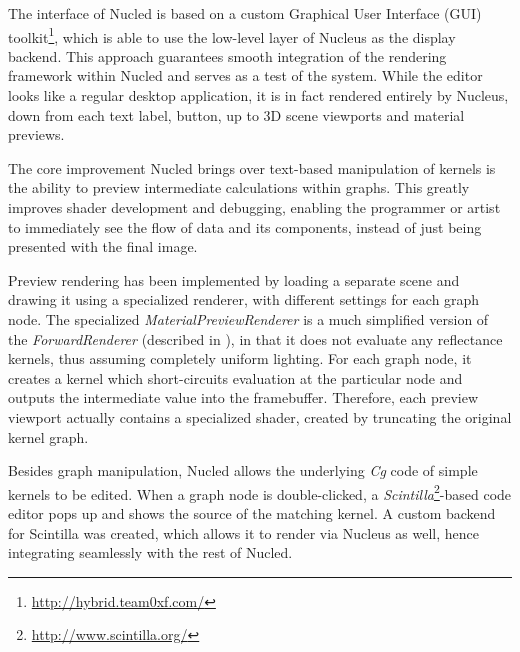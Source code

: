 The interface of Nucled is based on a custom Graphical User Interface (GUI) toolkit\footnote{\url{http://hybrid.team0xf.com/}}, which is able to use the low-level layer of Nucleus as the display backend. This approach guarantees smooth integration of the rendering framework within Nucled and serves as a test of the system. While the editor looks like a regular desktop application, it is in fact rendered entirely by Nucleus, down from each text label, button, up to 3D scene viewports and material previews.

The core improvement Nucled brings over text-based manipulation of kernels is the ability to preview intermediate calculations within graphs. This greatly improves shader development and debugging, enabling the programmer or artist to immediately see the flow of data and its components, instead of just being presented with the final image.

Preview rendering has been implemented by loading a separate scene and drawing it using a specialized renderer, with different settings for each graph node. The specialized \emph{MaterialPreviewRenderer} is a much simplified version of the \emph{ForwardRenderer} (described in ), in that it does not evaluate any reflectance kernels, thus assuming completely uniform lighting. For each graph node, it creates a kernel which short-circuits evaluation at the particular node and outputs the intermediate value into the framebuffer. Therefore, each preview viewport actually contains a specialized shader, created by truncating the original kernel graph.

Besides graph manipulation, Nucled allows the underlying \emph{Cg} code of simple kernels to be edited. When a graph node is double-clicked, a \emph{Scintilla}\footnote{\url{http://www.scintilla.org/}}-based code editor pops up and shows the source of the matching kernel. A custom backend for Scintilla was created, which allows it to render via Nucleus as well, hence integrating seamlessly with the rest of Nucled.



